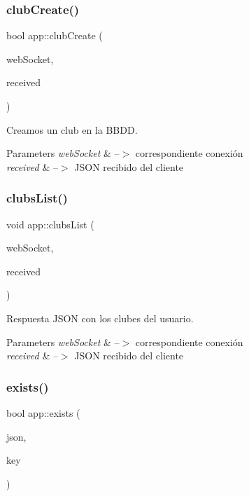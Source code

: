 \subsubsection{\texorpdfstring{club\+Create()}{clubCreate()}}
{\footnotesize\ttfamily bool app\+::club\+Create (\begin{DoxyParamCaption}\item[{ix\+::\+Web\+Socket $\ast$}]{web\+Socket,  }\item[{J\+S\+ON}]{received }\end{DoxyParamCaption})}



Creamos un club en la B\+B\+DD. 


\begin{DoxyParams}{Parameters}
{\em web\+Socket} & --$>$ correspondiente conexión \\
\hline
{\em received} & --$>$ J\+S\+ON recibido del cliente \\
\hline
\end{DoxyParams}
\mbox{\label{classapp_aacb1fe686708ce187073676232491baf}} 
\subsubsection{\texorpdfstring{clubs\+List()}{clubsList()}}
{\footnotesize\ttfamily void app\+::clubs\+List (\begin{DoxyParamCaption}\item[{ix\+::\+Web\+Socket $\ast$}]{web\+Socket,  }\item[{J\+S\+ON}]{received }\end{DoxyParamCaption})}



Respuesta J\+S\+ON con los clubes del usuario. 


\begin{DoxyParams}{Parameters}
{\em web\+Socket} & --$>$ correspondiente conexión \\
\hline
{\em received} & --$>$ J\+S\+ON recibido del cliente \\
\hline
\end{DoxyParams}
\mbox{\label{classapp_a42e2a44d3325daf63b3ec57b8921d1b5}} 
\subsubsection{\texorpdfstring{exists()}{exists()}}
{\footnotesize\ttfamily bool app\+::exists (\begin{DoxyParamCaption}\item[{const J\+S\+ON \&}]{json,  }\item[{const std\+::string \&}]{key }\end{DoxyParamCaption})}




